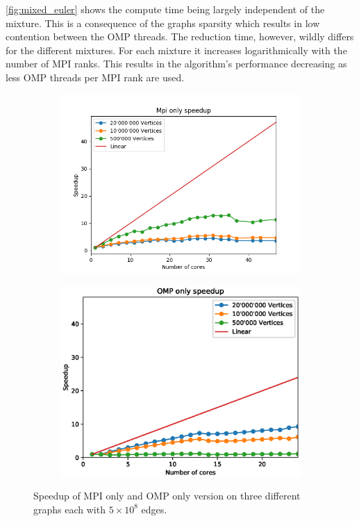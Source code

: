 \autoref{fig:mixed_euler} shows the compute time being largely independent of the mixture. This is a consequence of the graphs sparsity which results in low contention between the OMP threads. The reduction time, however, wildly differs for the different mixtures. For each mixture it increases logarithmically with the number of MPI ranks. This results in the algorithm's performance decreasing as less OMP threads per MPI rank are used.


\begin{figure}
\begin{subfigure}[c]{0.23\textwidth}
\includegraphics[width=\textwidth]{plots/mpi_speedup_with_ref}
\label{fig:speedup_mpi}
\end{subfigure}
\begin{subfigure}[c]{0.23\textwidth}
\includegraphics[width=\textwidth]{plots/omp_speedup_with_ref}
\label{fig:speedup_omp}
\end{subfigure}
\caption{Speedup of MPI only and OMP only version on three different graphs each with $5\times10^{8}$ edges.}
\label{fig:speedup}
\end{figure}


